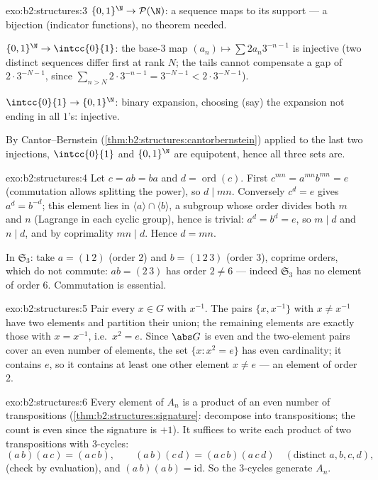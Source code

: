 \begin{solution}{exo:b2:structures:3}
$\{0,1\}^{\N} \to \mathcal{P}(\N)$: a sequence maps to its support
--- a bijection (indicator functions), no theorem needed.

$\{0,1\}^{\N} \to \intcc{0}{1}$: the base-$3$ map $(a_n) \mapsto
\sum 2a_n 3^{-n-1}$ is injective (two distinct sequences differ
first at rank $N$; the tails cannot compensate a gap of $2\cdot
3^{-N-1}$, since $\sum_{n > N} 2\cdot 3^{-n-1} = 3^{-N-1} <
2\cdot3^{-N-1}$).

$\intcc{0}{1} \to \{0,1\}^{\N}$: binary expansion, choosing (say)
the expansion not ending in all $1$'s: injective.

By Cantor--Bernstein (\cref{thm:b2:structures:cantorbernstein})
applied to the last two injections, $\intcc{0}{1}$ and
$\{0,1\}^{\N}$ are equipotent, hence all three sets are.
\end{solution}

\begin{solution}{exo:b2:structures:4}
Let $c = ab = ba$ and $d = \operatorname{ord}(c)$. First $c^{mn} =
a^{mn} b^{mn} = e$ (commutation allows splitting the power), so $d
\mid mn$. Conversely $c^d = e$ gives $a^d = b^{-d}$; this element
lies in $\langle a\rangle \cap \langle b\rangle$, a subgroup whose
order divides both $m$ and $n$ (Lagrange in each cyclic group),
hence is trivial: $a^d = b^d = e$, so $m \mid d$ and $n \mid d$, and
by coprimality $mn \mid d$. Hence $d = mn$.

In $\mathfrak{S}_3$: take $a = (1\,2)$ (order $2$) and $b =
(1\,2\,3)$ (order $3$), coprime orders, which do not commute: $ab =
(2\,3)$ has order $2 \neq 6$ --- indeed $\mathfrak{S}_3$ has no
element of order $6$. Commutation is essential.
\end{solution}

\begin{solution}{exo:b2:structures:5}
Pair every $x \in G$ with $x^{-1}$. The pairs $\{x, x^{-1}\}$ with
$x \neq x^{-1}$ have two elements and partition their union; the
remaining elements are exactly those with $x = x^{-1}$, i.e.\ $x^2 =
e$. Since $\abs G$ is even and the two-element pairs cover an even
number of elements, the set $\{x : x^2 = e\}$ has even cardinality;
it contains $e$, so it contains at least one other element $x \neq
e$ --- an element of order $2$.
\end{solution}

\begin{solution}{exo:b2:structures:6}
Every element of $A_n$ is a product of an even number of
transpositions (\cref{thm:b2:structures:signature}: decompose into
transpositions; the count is even since the signature is $+1$). It
suffices to write each product of two transpositions with
$3$-cycles:
\[
(a\,b)(a\,c) = (a\,c\,b),
\qquad
(a\,b)(c\,d) = (a\,c\,b)(a\,c\,d) \quad (\text{distinct } a,b,c,d),
\]
(check by evaluation), and $(a\,b)(a\,b) = \mathrm{id}$. So the
$3$-cycles generate $A_n$.
\end{solution}

